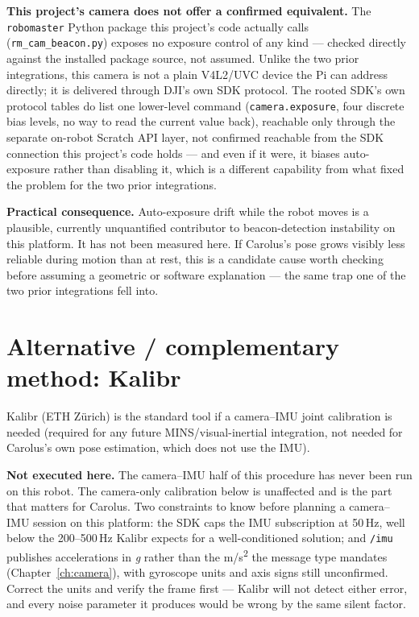 \documentclass[11pt]{report}
\begin{document}
\textbf{This project's camera does not offer a confirmed equivalent.} The
\texttt{robomaster} Python package this project's code actually calls
(\texttt{rm\_cam\_beacon.py}) exposes no exposure control of any kind ---
checked directly against the installed package source, not assumed. Unlike
the two prior integrations, this camera is not a plain V4L2/UVC device the
Pi can address directly; it is delivered through DJI's own SDK protocol. The
rooted SDK's own protocol tables do list one lower-level command
(\texttt{camera.exposure}, four discrete bias levels, no way to read the
current value back), reachable only through the separate on-robot Scratch
API layer, not confirmed reachable from the SDK connection this project's
code holds --- and even if it were, it biases auto-exposure rather than
disabling it, which is a different capability from what fixed the problem
for the two prior integrations.

\textbf{Practical consequence.} Auto-exposure drift while the robot moves is
a plausible, currently unquantified contributor to beacon-detection
instability on this platform. It has not been measured here. If Carolus's
pose grows visibly less reliable during motion than at rest, this is a
candidate cause worth checking before assuming a geometric or software
explanation --- the same trap one of the two prior integrations fell into.

\section{Alternative / complementary method: Kalibr}
\label{sec:kalibr-alt}

Kalibr (ETH Zürich) is the standard tool if a camera--IMU joint calibration
is needed (required for any future MINS/visual-inertial integration, not
needed for Carolus's own pose estimation, which does not use the IMU).

\textbf{Not executed here.} The camera--IMU half of this procedure has never
been run on this robot. The camera-only calibration below is unaffected and
is the part that matters for Carolus. Two constraints to know before planning
a camera--IMU session on this platform: the SDK caps the IMU subscription at
50\,Hz, well below the 200--500\,Hz Kalibr expects for a well-conditioned
solution; and \texttt{/imu} publishes accelerations in \emph{g} rather than
the m/s\textsuperscript{2} the message type mandates
(Chapter~\ref{ch:camera}), with gyroscope units and axis signs still
unconfirmed. Correct the units and verify the frame first --- Kalibr will not
detect either error, and every noise parameter it produces would be wrong by
the same silent factor.
\end{document}

